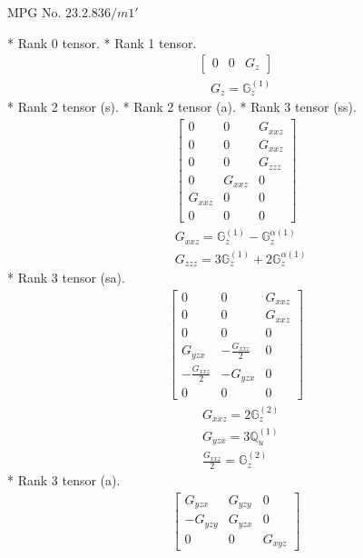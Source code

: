 \documentclass[fleqn,8pt,landscape]{jsarticle}
\begin{document}
\setcounter{MaxMatrixCols}{32}

\renewcommand{\tablename}{Table~}
\renewcommand{\figurename}{Figure~}
\begin{center}
\LARGE
MPG No. 23.2.83\quad$6/m1'$
\end{center}
* Rank 0 tensor.
* Rank 1 tensor.
\begin{align*}
\begin{bmatrix} 0 & 0 & G_{z} \end{bmatrix}
\end{align*}
\begin{align*}
& G_{z} = \mathbb{G}_{z}^{(1)}
\end{align*}
* Rank 2 tensor (s).
* Rank 2 tensor (a).
* Rank 3 tensor (ss).
\begin{align*}
\begin{bmatrix} 0 & 0 & G_{xxz} \\ 0 & 0 & G_{xxz} \\ 0 & 0 & G_{zzz} \\ 0 & G_{xxz} & 0 \\ G_{xxz} & 0 & 0 \\ 0 & 0 & 0 \end{bmatrix}
\end{align*}
\begin{align*}
& G_{xxz} = \mathbb{G}_{z}^{(1)} - \mathbb{G}_{z}^{\alpha(1)} \\
& G_{zzz} = 3 \mathbb{G}_{z}^{(1)} + 2 \mathbb{G}_{z}^{\alpha(1)}
\end{align*}
* Rank 3 tensor (sa).
\begin{align*}
\begin{bmatrix} 0 & 0 & G_{xxz} \\ 0 & 0 & G_{xxz} \\ 0 & 0 & 0 \\ G_{yzx} & - \frac{G_{xxz}}{2} & 0 \\ - \frac{G_{xxz}}{2} & - G_{yzx} & 0 \\ 0 & 0 & 0 \end{bmatrix}
\end{align*}
\begin{align*}
& G_{xxz} = 2 \mathbb{G}_{z}^{(2)} \\
& G_{yzx} = 3 \mathbb{Q}_{u}^{(1)} \\
& \frac{G_{xxz}}{2} = \mathbb{G}_{z}^{(2)}
\end{align*}
* Rank 3 tensor (a).
\begin{align*}
\begin{bmatrix} G_{yzx} & G_{yzy} & 0 \\ - G_{yzy} & G_{yzx} & 0 \\ 0 & 0 & G_{xyz} \end{bmatrix}
\end{align*}
\end{document}
